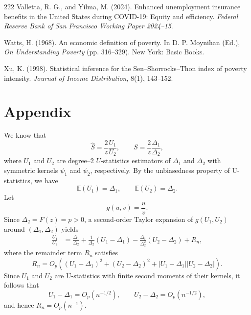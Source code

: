 \documentclass[11pt]{article}
\begin{document}
\begin{thebibliography}{222}
\bibitem{} Valletta, R. G., and Yilma, M. (2024). Enhanced unemployment insurance benefits in the United States during COVID-19: Equity and efficiency. \emph{Federal Reserve Bank of San Francisco Working Paper 2024--15}.



\bibitem{} Watts, H. (1968). An economic definition of poverty. In D. P. Moynihan (Ed.), \emph{On Understanding Poverty} (pp. 316--329). New York: Basic Books.

 Xu, K. (1998). Statistical inference for the Sen–Shorrocks–Thon index of poverty intensity. \emph{Journal of Income Distribution}, 8(1), 143--152.



%
%
\end{thebibliography}


 \section{Appendix}

We know that
$$
\widehat{S}=\frac{2}{z}\frac{U_1}{U_2},
\qquad
S=\frac{2}{z}\frac{\Delta_1}{\Delta_2},
$$
where $U_1$ and $U_2$ are degree--2 $U$-statistics estimators  of $\Delta_1$ and $\Delta_2$ with symmetric kernels
$\psi_1$ and $\psi_2$, respectively.
By the unbiasedness property of U-statistics, we have
$$
\mathbb{E}(U_1)=\Delta_1,
\qquad
\mathbb{E}(U_2)=\Delta_2.$$
Let
$$
g(u,v)=\frac{u}{v}.
$$
Since $\Delta_2=F(z)=p>0$, a second-order Taylor expansion of
$g(U_1,U_2)$ around $(\Delta_1,\Delta_2)$ yields
\begin{align}
\frac{U_1}{U_2}
&= \frac{\Delta_1}{\Delta_2}
  + \frac{1}{\Delta_2}(U_1-\Delta_1)
  - \frac{\Delta_1}{\Delta_2^2}(U_2-\Delta_2)
  + R_n,
\label{taylor}
\end{align}
where the remainder term $R_n$ satisfies
$$
R_n
= O_p\!\left((U_1-\Delta_1)^2+(U_2-\Delta_2)^2
+|U_1-\Delta_1||U_2-\Delta_2|\right).
$$
Since $U_1$ and $U_2$ are U-statistics with finite second moments of their
kernels, it follows that
$$
U_1-\Delta_1 = O_p(n^{-1/2}),
\qquad
U_2-\Delta_2 = O_p(n^{-1/2}),
$$
and hence $R_n=O_p(n^{-1})$.
\end{document}
